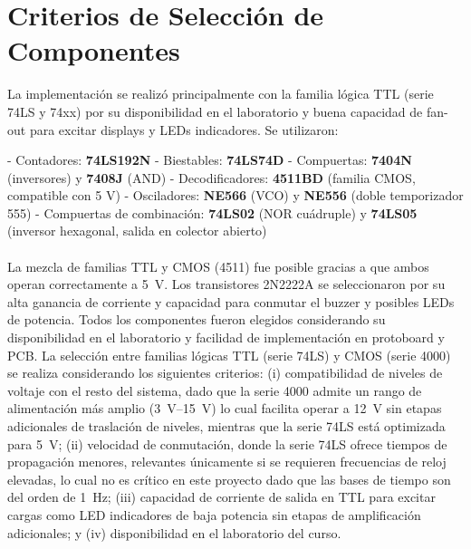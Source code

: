 \documentclass[10pt,onecolumn]{IEEEtran}
\begin{document}

\section{Criterios de Selección de Componentes}
La implementación se realizó principalmente con la familia lógica TTL (serie 74LS y 74xx) por su disponibilidad en el laboratorio y buena capacidad de fan-out para excitar displays y LEDs indicadores. Se utilizaron:

- Contadores: \textbf{74LS192N}
- Biestables: \textbf{74LS74D}
- Compuertas: \textbf{7404N} (inversores) y \textbf{7408J} (AND)
- Decodificadores: \textbf{4511BD} (familia CMOS, compatible con 5 V)
- Osciladores: \textbf{NE566} (VCO) y \textbf{NE556} (doble temporizador 555)
- Compuertas de combinación: \textbf{74LS02} (NOR cuádruple) y \textbf{74LS05} (inversor hexagonal, salida en colector abierto)
\\
\\
La mezcla de familias TTL y CMOS (4511) fue posible gracias a que ambos operan correctamente a \SI{5}{\volt}. Los transistores 2N2222A se seleccionaron por su alta ganancia de corriente y capacidad para conmutar el buzzer y posibles LEDs de potencia. Todos los componentes fueron elegidos considerando su disponibilidad en el laboratorio y facilidad de implementación en protoboard y PCB.
La selección entre familias lógicas TTL (serie 74LS) y CMOS (serie 4000) se realiza considerando los siguientes criterios: (i) compatibilidad de niveles de voltaje con el resto del sistema, dado que la serie 4000 admite un rango de alimentación más amplio (\SIrange{3}{15}{\volt}) lo cual facilita operar a \SI{12}{\volt} sin etapas adicionales de traslación de niveles, mientras que la serie 74LS está optimizada para \SI{5}{\volt}; (ii) velocidad de conmutación, donde la serie 74LS ofrece tiempos de propagación menores, relevantes únicamente si se requieren frecuencias de reloj elevadas, lo cual no es crítico en este proyecto dado que las bases de tiempo son del orden de \SI{1}{\hertz}; (iii) capacidad de corriente de salida en TTL para excitar cargas como LED indicadores de baja potencia sin etapas de amplificación adicionales; y (iv) disponibilidad en el laboratorio del curso.
\end{document}
